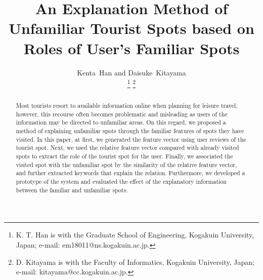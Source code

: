 \documentclass[journal]{IAENGtran}
\begin{document}
\title{An Explanation Method of Unfamiliar Tourist Spots based on Roles of User's Familiar Spots}
\author{Kenta~Han and Daisuke~Kitayama

\thanks{K. T. Han is with the Graduate School of Engineering, Kogakuin University, Japan; e-mail: em18011@ns.kogakuin.ac.jp.}%
\thanks{D. Kitayama is with the Faculty of Informatics, Kogakuin University, Japan;  e-mail: kitayama@cc.kogakuin.ac.jp.}}%

\maketitle

\pagestyle{empty}
\thispagestyle{empty}

\begin{abstract}
Most tourists resort to available information online when planning for leisure travel; however, this recourse often becomes problematic and misleading as users of the information may be directed to unfamiliar areas.
On this regard, we proposed a method of explaining unfamiliar spots through the familiar features of spots they have visited.
In this paper, at first, we generated the feature vector using user reviews of the tourist spot.
Next, we used the relative feature vector compared with already visited spots to extract the role of the tourist spot for the user.
Finally, we associated the visited spot with the unfamiliar spot by the similarity of the relative feature vector, and further extracted keywords that explain the relation.
Furthermore, we developed a prototype of the system and evaluated the effect of the explanatory information between the familiar and unfamiliar spots.
\end{abstract}
\end{document}
